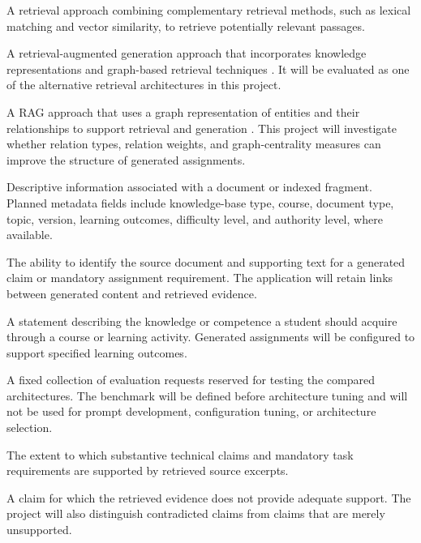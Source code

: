 \documentclass[12pt,a4paper]{article}
\begin{document}
\begin{description}[style=nextline]
\item[Hybrid retrieval]
A retrieval approach combining complementary retrieval methods,
such as lexical matching and vector similarity, to retrieve
potentially relevant passages.

\item[LightRAG]
A retrieval-augmented generation approach that incorporates
knowledge representations and graph-based retrieval techniques
\cite{guo2024lightrag}. It will be evaluated as one of the
alternative retrieval architectures in this project.

\item[GraphRAG]
A RAG approach that uses a graph representation of entities and
their relationships to support retrieval and generation
\cite{edge2024graphrag}. This project will investigate whether
relation types, relation weights, and graph-centrality measures
can improve the structure of generated assignments.

\item[Metadata]
Descriptive information associated with a document or indexed
fragment. Planned metadata fields include knowledge-base type,
course, document type, topic, version, learning outcomes,
difficulty level, and authority level, where available.

\item[Source traceability]
The ability to identify the source document and supporting text
for a generated claim or mandatory assignment requirement.
The application will retain links between generated content
and retrieved evidence.

\item[Learning outcome]
A statement describing the knowledge or competence a student
should acquire through a course or learning activity. Generated
assignments will be configured to support specified learning
outcomes.

\item[Held-out benchmark]
A fixed collection of evaluation requests reserved for testing
the compared architectures. The benchmark will be defined before
architecture tuning and will not be used for prompt development,
configuration tuning, or architecture selection.

\item[Evidence coverage]
The extent to which substantive technical claims and mandatory
task requirements are supported by retrieved source excerpts.

\item[Unsupported claim]
A claim for which the retrieved evidence does not provide
adequate support. The project will also distinguish contradicted
claims from claims that are merely unsupported.


\end{description}
\end{document}
